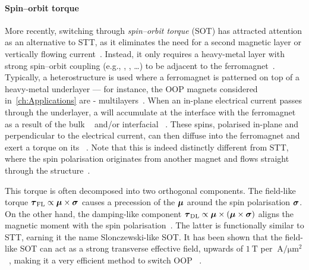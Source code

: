 \paragraph{Spin--orbit torque}
More recently, switching through \emph{spin--orbit torque} (SOT) has attracted attention as an alternative to STT, as it eliminates the need for a second magnetic layer or vertically flowing current~\cite{mumax3tutorial}.
Instead, it only requires a heavy-metal layer with strong spin--orbit coupling (e.g., , ,  \dots) to be adjacent to the ferromagnet~\cite{SOT_Roadmap}.
Typically, a heterostructure is used where a ferromagnet is patterned on top of a heavy-metal underlayer --- for instance, the OOP magnets considered in~\cref{ch:Applications} are - multilayers~\cite{KUR-24}. %
When an in-plane electrical current passes through the underlayer, a  will accumulate at the interface with the ferromagnet as a result of the bulk ~\cite{SHE} and/or interfacial ~\cite{SOT_Rashba}. %
These spins, polarised in-plane and perpendicular to the electrical current, can then diffuse into the ferromagnet and exert a torque on its ~\cite{mumax3tutorial}.
Note that this is indeed distinctly different from STT, where the spin polarisation originates from another magnet and flows straight through the structure~\cite{SOT_Roadmap}. \par
This torque is often decomposed into two orthogonal components.
The field-like torque $\boldsymbol{\mathbf{\tau}}_\mathrm{FL} \propto \boldsymbol{\mathbf{\mu}} \times \boldsymbol{\mathbf{\sigma}}$ causes a precession of the  $\boldsymbol{\mathbf{\mu}}$ around the spin polarisation $\boldsymbol{\mathbf{\sigma}}$.
On the other hand, the damping-like component $\boldsymbol{\mathbf{\tau}}_\mathrm{DL} \propto \boldsymbol{\mathbf{\mu}} \times (\boldsymbol{\mathbf{\mu}} \times \boldsymbol{\mathbf{\sigma}})$ aligns the magnetic moment with the spin polarisation~\cite{SOT_Roadmap,SOT_FM_AFM}.
The latter is functionally similar to STT, earning it the name Slonczewski-like SOT.
It has been shown that the field-like SOT can act as a strong transverse effective field, upwards of $\SI{1}{\tesla}$ per $\SI{}{\ampere\per\micro\metre\squared}$~\cite{SOT_Rashba}, making it a very efficient method to switch OOP ~\cite{vlasov2022optimal,SOTswitchingCoPt,SHE_CurrentInducedSwitching,SpintronicsEnergyEfficientComputing}. \par
